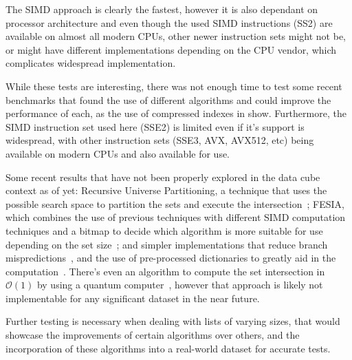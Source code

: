 The SIMD approach is clearly the fastest, however it is also dependant on processor architecture and even though the used SIMD instructions (SS2) are available on almost all modern CPUs, other newer instruction sets might not be, or might have different implementations depending on the CPU vendor, which complicates widespread implementation.

While these tests are interesting, there was not enough time to test some recent benchmarks that found the use of different algorithms and could improve the performance of each, as the use of compressed indexes in \cite{pibiriTechniquesInvertedIndex2019} show.
Furthermore, the SIMD instruction set used here (SSE2) is limited even if it's support is widespread, with other instruction sets (SSE3, AVX, AVX512, etc) being available on modern CPUs and also available for use.

Some recent results that have not been properly explored in the data cube context as of yet: Recursive Universe Partitioning, a technique that uses the possible search space to partition the sets and execute the intersection~\cite{pibiriFastCompactSet2021}; FESIA, which combines the use of previous techniques with different SIMD computation techniques and a bitmap to decide which algorithm is more suitable for use depending on the set size~\cite{zhangFESIAFastSIMDEfficient2020}; and simpler implementations that reduce branch mispredictions~\cite{inoueFasterSetIntersection2014}, and the use of pre-processed dictionaries to greatly aid in the computation~\cite{dingFastSetIntersection2011a}.
There's even an algorithm to compute the set intersection in $\mathcal{O}(1)$ by using a quantum computer~\cite{tianQuantumAlgorithmFinding2019}, however that approach is likely not implementable for any significant dataset in the near future.

Further testing is necessary when dealing with lists of varying sizes, that would showcase the improvements of certain algorithms over others, and the incorporation of these algorithms into a real-world dataset for accurate tests.


